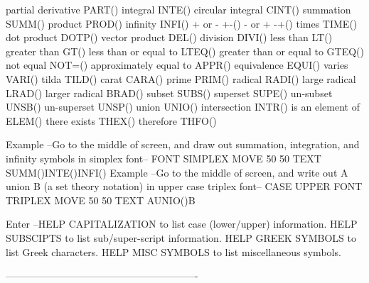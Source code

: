   partial derivative       PART()
   integral                 INTE()
   circular integral        CINT()
   summation                SUMM()
   product                  PROD()
   infinity                 INFI()
   + or -                   +-()
   - or +                   -+()
   times                    TIME()
   dot product              DOTP()
   vector product           DEL()
   division                 DIVI()
   less than                LT()
   greater than             GT()
   less than or equal to    LTEQ()
   greater than or equal to GTEQ()
   not equal                NOT=()
   approximately equal to   APPR()
   equivalence              EQUI()
   varies                   VARI()
   tilda                    TILD()
   carat                    CARA()
   prime                    PRIM()
   radical                  RADI()
   large radical            LRAD()
   larger radical           BRAD()
   subset                   SUBS()
   superset                 SUPE()
   un-subset                UNSB()
   un-superset              UNSP()
   union                    UNIO()
   intersection             INTR()
   is an element of         ELEM()
   there exists             THEX()
   therefore                THFO()
 
Example --Go to the middle of screen, and draw out summation,
          integration, and infinity symbols in simplex font--
             FONT SIMPLEX
             MOVE 50 50
             TEXT SUMM()INTE()INFI()
Example --Go to the middle of screen, and write out
             A union B
          (a set theory notation) in upper case triplex font--
             CASE UPPER
             FONT TRIPLEX
             MOVE 50 50
             TEXT AUNIO()B
 
Enter   --HELP CAPITALIZATION to list case (lower/upper) information.
          HELP SUBSCIPTS to list sub/super-script information.
          HELP GREEK SYMBOLS to list Greek characters.
          HELP MISC SYMBOLS to list miscellaneous symbols.
 
----------------------------------------------------------
 
 
 
 
 
 
 
 
 
 
 
 
 
 
 
 
 
 
 
 
 
 
 

